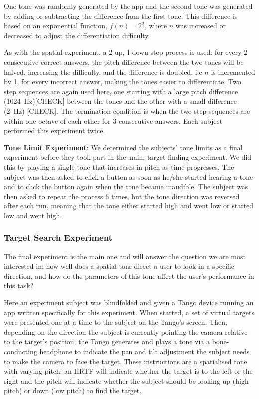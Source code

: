 \documentclass[format=sigconf, review=true, screen=true, anonymous=true]{acmart}
\begin{document}
One tone was randomly generated by the app and the second tone was generated by adding or subtracting the difference from the first tone. This difference is based on an exponential function, $f(n) = 2^2$, where $n$ was increased or decreased to adjust the differentiation difficulty. 

As with the spatial experiment, a 2-up, 1-down step process is used: for every 2 consecutive correct answers, the pitch difference between the two tones will be halved, increasing the difficulty, and the difference is doubled, i.e $n$ is incremented by 1, for every incorrect answer, making the tones easier to differentiate. Two step sequences are again used here, one starting with a large pitch difference (\SI{1024}{\hertz})[CHECK] between the tones and the other with a small difference (\SI{2}{\hertz}) [CHECK]. The termination condition is when the two step sequences are within one octave of each other for 3 consecutive answers. Each subject performed this experiment twice. 

\textbf{Tone Limit Experiment}: We determined the subjects' tone limits as a final experiment before they took part in the  main, target-finding experiment. We did this by playing a single tone that increases in pitch as time progresses. The subject was then asked to click a button as soon as he/she started hearing a tone and to click the button again when the tone became inaudible. The subject was then asked to repeat the process 6 times, but the tone direction was reversed after each run, meaning that the tone either started high and went low or started low and went high. 

\subsubsection{Target Search Experiment}\hfill

The final experiment is the main one and will answer the question we are most interested in: how well does a spatial tone direct a user to look in a specific direction, and how do the parameters of this tone affect the user's performance in this task? 

Here an experiment subject was blindfolded and given a Tango device running an app written specifically for this experiment. When started, a set of virtual targets were presented one at a time to the subject on the Tango's screen. Then, depending on the direction the subject is currently pointing the camera relative to the target's position, the Tango generates and plays a tone via a bone-conducting headphone to indicate the pan and tilt adjustment the subject needs to make the camera to face the target. These instructions are a spatialised tone with varying pitch: an HRTF will indicate whether the target is to the left or the right and the pitch will indicate whether the subject should be looking up (high pitch) or down (low pitch) to find the target. 
\end{document}
